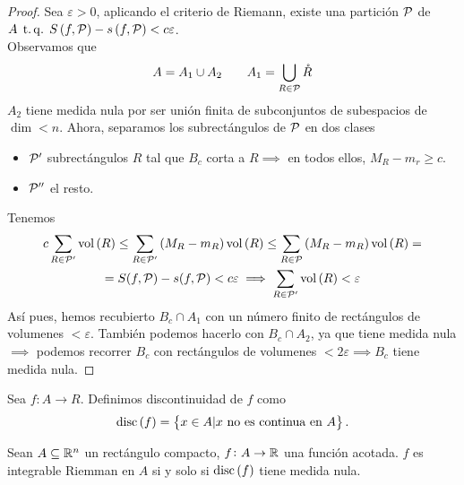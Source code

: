\begin{proof}
    Sea $\varepsilon > 0$, aplicando el criterio de Riemann, existe una partición $\mathcal{P}$ de $A \operatorname{\;t.q.\;} S \left( f, \mathcal{P} \right) - s \left( f, \mathcal{P} \right) < c\varepsilon$. \\
    Observamos que 
    \[
        A = A_1 \cup A_2 \qquad A_1 = \bigcup_{R \in \mathcal{P}} \mathring{R}
    \]
    $A_2$ tiene medida nula por ser unión finita de subconjuntos de subespacios de
    $\dim < n$. Ahora, separamos los subrectángulos de $\mathcal{P}$ en dos clases
    \begin{itemize}
        \item $\mathcal{P}^\prime$ subrectángulos $R$ tal que $B_c$ corta a $R \implies$ en
            todos ellos, $M_R - m_r \geq c$.
        \item $\mathcal{P}^{\prime\prime}$ el resto.
    \end{itemize}
    Tenemos
    \begin{gather*}
        c \sum_{R \in \mathcal{P}^\prime}\operatorname{vol}\left( R \right) \leq 
        \sum_{R \in \mathcal{P}^\prime}\left( M_R - m_R \right) \operatorname{vol}\left( R \right) \leq
        \sum_{R \in \mathcal{P}} \left( M_R -m_R \right)\operatorname{vol} \left( R \right) =\\=
        S(f, \mathcal{P}) - s(f, \mathcal{P}) < c\varepsilon \implies \sum_{R \in \mathcal{P}^\prime}
        \operatorname{vol}\left( R \right) < \varepsilon
    \end{gather*}
    Así pues, hemos recubierto $B_c \cap A_1$ con un número finito de rectángulos de
    volumenes $< \varepsilon$. Tambi\'en podemos hacerlo con $B_c \cap A_2$, ya que
    tiene medida nula $\implies$ podemos recorrer $B_c$ con rectángulos de volumenes
    $< 2\varepsilon \implies B_c$ tiene medida nula.
\end{proof}

\begin{defi*}
    Sea $f \colon A \to R$. Definimos discontinuidad de $f$ como
    \[
        \operatorname{disc}\left( f \right) = \left\{x \in A \vert x \text{ no es continua en }A\right\}.
    \]
\end{defi*}

\begin{teo}[de Lebesgue]
    Sean $A \subseteq \mathbb{R}^n$ un rectángulo compacto, $f \colon A \to \mathbb{R}$ una
    función acotada. $f$ es integrable Riemman en $A$ si y solo si
    $\operatorname{disc}\left( f \right)$ tiene medida nula.
\end{teo}

